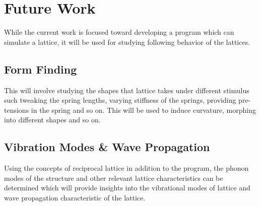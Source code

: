 \chapter{Future Work}


While the current work is focused toward developing a program which can simulate a lattice, it will be used for studying following behavior of the lattices.

\section{Form Finding}
This will involve studying the shapes that lattice takes under different stimulus such tweaking the spring lengths, varying stiffness of the springs, providing pre-tensions in the spring and so on. This will be used to induce curvature, morphing into different shapes and so on.

\section{Vibration Modes \& Wave Propagation}
Using the concepts of reciprocal lattice in addition to the program, the phonon modes of the structure and other relevant lattice characteristics can be determined which will provide insights into the vibrational modes of lattice and wave propagation characteristic of the lattice.

